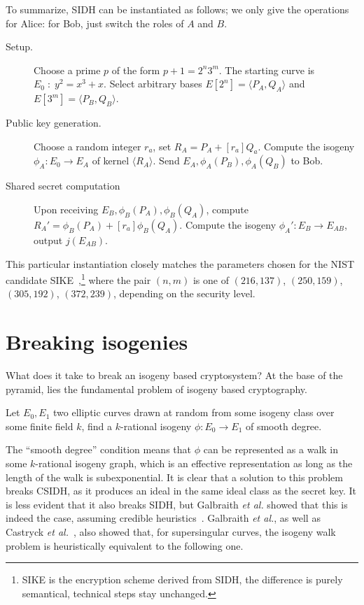 \begin{otherlanguage}{english}
To summarize, SIDH can be instantiated as follows; we only give the
operations for Alice: for Bob, just switch the roles of $A$ and $B$.
\begin{description}
\item[Setup.] Choose a prime $p$ of the form $p+1=2^n3^m$. The starting
  curve is $E_0\;:\;y^2=x^3+x$. Select arbitrary bases
  $E[2^n]=\langle P_A,Q_A\rangle$ and $E[3^m]=\langle P_B,Q_B\rangle$.
\item[Public key generation.] Choose a random integer $r_a$, set
  $R_A=P_A+[r_a]Q_a$. Compute the isogeny $\phi_A:E_0\to E_A$ of
  kernel $\langle R_A\rangle$. Send $E_A,\phi_A(P_B),\phi_A(Q_B)$ to Bob.
\item[Shared secret computation] Upon receiving
  $E_B,\phi_B(P_A),\phi_B(Q_A)$, compute
  $R_A'=\phi_B(P_A)+[r_a]\phi_B(Q_A)$. Compute the isogeny
  $\phi_A':E_B\to E_{AB}$, output $j(E_{AB})$.
\end{description}

This particular instantiation closely matches the parameters chosen
for the NIST candidate SIKE~\cite{SIKE},\footnote{SIKE is the
  encryption scheme derived from SIDH, the difference is purely
  semantical, technical steps stay unchanged.} where the pair $(n,m)$
is one of $(216,137)$, $(250, 159)$, $(305, 192)$, $(372, 239)$,
depending on the security level.


\section{Breaking isogenies}
What does it take to break an isogeny based cryptosystem? At the base
of the pyramid, lies the fundamental problem of isogeny based
cryptography.

\begin{definition}
  Let $E_0,E_1$ two elliptic curves drawn at random from some isogeny
  class over some finite field $k$, find a $k$-rational isogeny
  $\phi:E_0\to E_1$ of smooth degree.
\end{definition}

The ``smooth degree'' condition means that $\phi$ can be represented
as a walk in some $k$-rational isogeny graph, which is an effective
representation as long as the length of the walk is subexponential.
It is clear that a solution to this problem breaks CSIDH, as it
produces an ideal in the same ideal class as the secret key.  It is
less evident that it also breaks SIDH, but Galbraith \emph{et al.}
showed that this is indeed the case, assuming credible
heuristics~\cite{AC:GPST16}. Galbraith \emph{et al.}, as well as
Castryck \emph{et al.}~\cite{EC:CasPanVer20}, also showed that, for
supersingular curves, the isogeny walk problem is heuristically
equivalent to the following one.


\end{otherlanguage}
